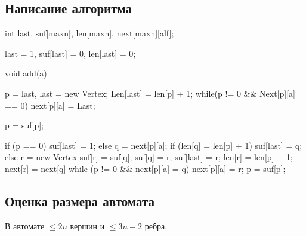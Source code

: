 \subsection{Написание алгоритма}
\begin{cppcode}
int last, suf[maxn], len[maxn], next[maxn][alf];

last = 1, 
suf[last] = 0, 
len[last] = 0;

void add(a) {
    p = last, last = new Vertex;
    Len[last] = len[p] + 1;
    while(p != 0 && Next[p][a] == 0) {
        next[p][a] = Last;
    }
    
    p = suf[p];
    
    if (p == 0) {
        suf[last] = 1;
    } else {
        q = next[p][a];
        if (len[q] = len[p] + 1) {
            suf[last] = q;
        } else {
            r = new Vertex
            suf[r] = suf[q];
            suf[q] = r;
            suf[last] = r;
            len[r] = len[p] + 1;
            next[r] = next[q]
            while (p != 0 && next[p][a] = q)  {
                next[p][a] = r;
                p = suf[p];
            }
        }
    }
}

\end{cppcode}
\subsection{Оценка размера автомата}
\begin{theorem}
В автомате $\le 2n$ вершин и $\le 3n - 2$ ребра. 
\end{theorem}

